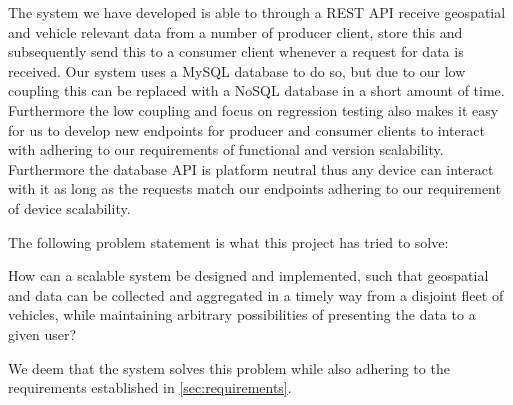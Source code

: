 \bigskip \noindent
The system we have developed is able to through a REST API receive geospatial and vehicle relevant data from a number of producer client, store this and subsequently send this to a consumer client whenever a request for data is received.
Our system uses a MySQL database to do so, but due to our low coupling this can be replaced with a NoSQL database in a short amount of time.
Furthermore the low coupling and focus on regression testing also makes it easy for us to develop new endpoints for producer and consumer clients to interact with adhering to our requirements of functional and version scalability.
Furthermore the database API is platform neutral thus any device can interact with it as long as the requests match our endpoints adhering to our requirement of device scalability.

The following problem statement is what this project has tried to solve:


\medskip
{\addtolength{\leftskip}{10mm}\addtolength{\rightskip}{10mm}\noindent\hrulefill\it

\noindent How can a scalable system be designed and implemented,
such that geospatial and data can be collected and aggregated in a timely way from a disjoint fleet of vehicles,
while maintaining arbitrary possibilities of presenting the data to a given user?

\noindent\hrulefill

}

We deem that the system solves this problem while also adhering to the requirements established in \cref{sec:requirements}.

